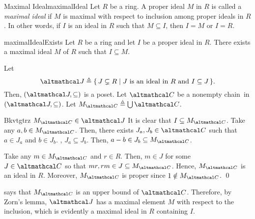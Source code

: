 \documentclass[../modern_algebra.tex]{subfiles}
\begin{document}
\begin{Definition}[colbacktitle=red!75!black]{Maximal Ideal}{maximalIdeal}
    Let \(R\) be a ring.
    A proper ideal \(M\) in \(R\) is called a \textit{maximal ideal} if
    \(M\) is maximal with respect to inclusion among proper ideals in \(R\).
    In other words, if \(I\) is an ideal in \(R\) such that \(M \subseteq I\),
    then \(I = M\) or \(I = R\).
\end{Definition}

\begin{Theorem}{\textsf{}}{maximalIdealExists}
    Let \(R\) be a ring and let \(I\) be a proper ideal in \(R\).
    There exists a maximal ideal \(M\) of \(R\) such that \(I \subseteq M\).
\end{Theorem}
\begin{myproof}[Proof]
    Let
    \[
        \mcal{J} \triangleq \{\,J \subsetneq R \mid J~\text{is an ideal in}~R~\text{and}~I \subseteq J\,\}.
    \]
    Then, \((\mcal{J}, \subseteq)\) is a poset.
    Let \(\mcal{C}\) be a nonempty chain\footnotemark\ in \((\mcal{J}, \subseteq)\).
    Let \(M_{\mcal{C}} \triangleq \bigcup \mcal{C}\).
    \begin{Claim}{}{Bkvtgtrz}
        \(M_{\mcal{C}} \in \mcal{J}\)
        \tcblower
        It is clear that \(I \subseteq M_{\mcal{C}}\).
        Take any \(a, b \in M_{\mcal{C}}\).
        Then, there exists \(J_a, J_b \in \mcal{C}\) such that \(a \in J_a\) and \(b \in J_b\).
        \WLOG, \(J_a \subseteq J_b\). Then, \(a - b \in J_b \subseteq M_{\mcal{C}}\).

        Take any \(m \in M_{\mcal{C}}\) and \(r \in R\).
        Then, \(m \in J\) for some \(J \in \mcal{C}\)
        so that \(mr, rm \in J \subseteq M_{\mcal{C}}\).
        Hence, \(M_{\mcal{C}}\) is an ideal in \(R\).
        Moreover, \(M_{\mcal{C}}\) is proper since \(1 \notin M_{\mcal{C}}\).
        \qed
    \end{Claim}

     says that \(M_{\mcal{C}}\) is an upper bound of \(\mcal{C}\).
    Therefore, by Zorn's lemma, \(\mcal{J}\) has a maximal element \(M\) with
    respect to the inclusion, which is evidently a maximal ideal in \(R\)
    containing \(I\).
\end{myproof}
\end{document}
